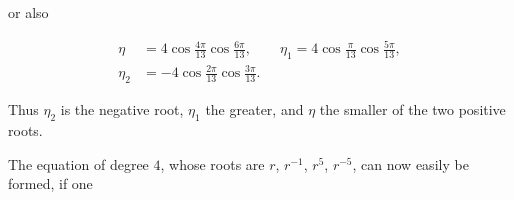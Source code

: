 or also

\[
\begin{aligned}
\eta &= 4\cos\frac{4\pi}{13}\cos\frac{6\pi}{13}, \qquad \eta_1 = 4\cos\frac{\pi}{13}\cos\frac{5\pi}{13},\\
\eta_2 &= -4\cos\frac{2\pi}{13}\cos\frac{3\pi}{13}.
\end{aligned}
\]

Thus $\eta_2$ is the negative root, $\eta_1$ the greater, and $\eta$ the smaller of the
two positive roots.

The equation of degree $4$, whose roots are $r$, $r^{-1}$, $r^5$, $r^{-5}$,
can now easily be formed, if one
